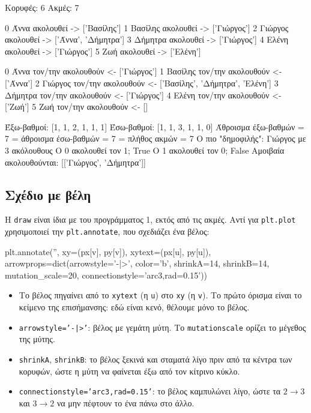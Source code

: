 \documentclass[11pt,a4paper]{article}
\newcommand{\code}[1]{\texttt{#1}}
\renewcommand{\_}{\textunderscore\allowbreak}
\begin{document}
\begin{output}
Κορυφές: 6   Ακμές: 7

0 Άννα     ακολουθεί -> ['Βασίλης']
1 Βασίλης  ακολουθεί -> ['Γιώργος']
2 Γιώργος  ακολουθεί -> ['Άννα', 'Δήμητρα']
3 Δήμητρα  ακολουθεί -> ['Γιώργος']
4 Ελένη    ακολουθεί -> ['Γιώργος']
5 Ζωή      ακολουθεί -> ['Ελένη']

0 Άννα     τον/την ακολουθούν <- ['Γιώργος']
1 Βασίλης  τον/την ακολουθούν <- ['Άννα']
2 Γιώργος  τον/την ακολουθούν <- ['Βασίλης', 'Δήμητρα', 'Ελένη']
3 Δήμητρα  τον/την ακολουθούν <- ['Γιώργος']
4 Ελένη    τον/την ακολουθούν <- ['Ζωή']
5 Ζωή      τον/την ακολουθούν <- []

Έξω-βαθμοί: [1, 1, 2, 1, 1, 1]
Έσω-βαθμοί: [1, 1, 3, 1, 1, 0]
Άθροισμα έξω-βαθμών = 7 = άθροισμα έσω-βαθμών = 7 = πλήθος ακμών = 7
Ο πιο "δημοφιλής": Γιώργος με 3 ακόλουθους
Ο 0 ακολουθεί τον 1; True
Ο 1 ακολουθεί τον 0; False
Αμοιβαία ακολουθούνται: [['Γιώργος', 'Δήμητρα']]
\end{output}

\subsection{Σχέδιο με βέλη}
Η \code{draw} είναι ίδια με του προγράμματος 1, εκτός από τις ακμές. Αντί για \code{plt.plot}
χρησιμοποιεί την \code{plt.annotate}, που σχεδιάζει ένα βέλος:
\begin{Piton}
plt.annotate('', xy=(px[v], py[v]), xytext=(px[u], py[u]),
             arrowprops=dict(arrowstyle='-|>', color='b', shrinkA=14, shrinkB=14,
                             mutation_scale=20, connectionstyle='arc3,rad=0.15'))
\end{Piton}
\begin{itemize}
  \item Το βέλος πηγαίνει από το \code{xytext} (η \code{u}) στο \code{xy} (η \code{v}). Το πρώτο
        όρισμα είναι το κείμενο της επισήμανσης: εδώ είναι κενό, θέλουμε μόνο το βέλος.
  \item \code{arrowstyle='-|>'}: βέλος με γεμάτη μύτη. Το \code{mutation\_scale} ορίζει το μέγεθος
        της μύτης.
  \item \code{shrinkA}, \code{shrinkB}: το βέλος ξεκινά και σταματά λίγο πριν από τα κέντρα των
        κορυφών, ώστε η μύτη να φαίνεται έξω από τον κίτρινο κύκλο.
  \item \code{connectionstyle='arc3,rad=0.15'}: το βέλος καμπυλώνει λίγο, ώστε τα $2 \to 3$ και
        $3 \to 2$ να μην πέφτουν το ένα πάνω στο άλλο.
\end{itemize}
\end{document}
